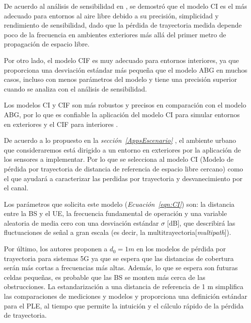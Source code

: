 De acuerdo al análisis de sensibilidad en \parencite{Sun2016}, se demostró que el modelo CI es el más adecuado para entornos al aire libre debido a su precisión, simplicidad y rendimiento de sensibilidad, dado que la pérdida de trayectoria medida depende poco de la frecuencia en ambientes exteriores más allá del primer metro de propagación de espacio libre.\newline

Por otro lado, el modelo CIF es muy adecuado para entornos interiores, ya que proporciona una desviación estándar más pequeña que el modelo ABG en muchos casos, incluso con menos parámetros del modelo y tiene una precisión superior cuando se analiza con el análisis de sensibilidad.\newline

Los modelos CI y CIF son más robustos y precisos en comparación con el modelo ABG, por lo que es confiable la aplicación del modelo CI para simular entornos en exteriores y el CIF para interiores \parencite{Sun2016}.\newline

De acuerdo a lo propuesto en la \textit{sección~\ref{AppsEscenario} }, el ambiente urbano que consideraremos está dirigido a un entorno en exteriores por la aplicación de los sensores a implementar. Por lo que se selecciona al modelo CI (Modelo de pérdida por trayectoria de distancia de referencia de espacio libre cercano) como el que ayudará a caracterizar las perdidas por trayectoria y desvanecimiento por el canal. \newline

Los parámetros que solicita este modelo (\textit{Ecuación~\ref{eqn:CI}}) son: la distancia entre la BS y el UE, la frecuencia fundamental de operación y una variable aleatoria de media cero con una desviación estándar $\sigma$ [dB], que describirá las fluctuaciones de señal a gran escala (es decir, la multitrayectoria[\textit{multipath}]).\newline

Por último, los autores proponen a $d_{0} = 1 m$ en los modelos de pérdida por trayectoria para sistemas 5G ya que se espera que las distancias de cobertura serán más cortas a frecuencias más altas. Además, lo que se espera son futuras celdas pequeñas, es probable que las BS se monten más cerca de las obstrucciones. La estandarización a una distancia de referencia de 1 m simplifica las comparaciones de mediciones y modelos y proporciona una definición estándar para el PLE, al tiempo que permite la intuición y el cálculo rápido de la pérdida de trayectoria.

